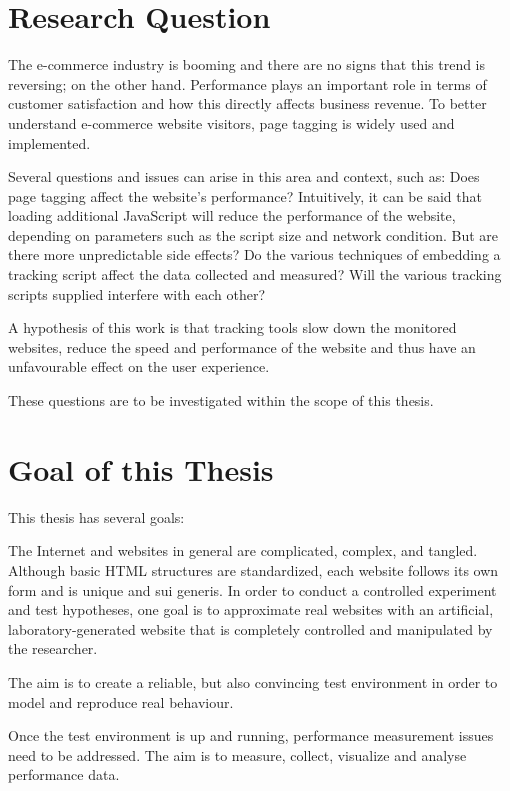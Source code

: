 \section{Research Question}
\label{chapter:research_question}

The e-commerce industry is booming and there are no signs that this trend is reversing; on the other hand.
Performance plays an important role in terms of customer satisfaction and how this directly affects business revenue.
To better understand e-commerce website visitors, page tagging is widely used and implemented.

Several questions and issues can arise in this area and context, such as: Does page tagging affect the website's performance?
Intuitively, it can be said that loading additional JavaScript will reduce the performance of the website, depending on parameters such as the script size and network condition.
But are there more unpredictable side effects?
Do the various techniques of embedding a tracking script affect the data collected and measured?
Will the various tracking scripts supplied interfere with each other?

A hypothesis of this work is that tracking tools slow down the monitored websites, reduce the speed and performance of the website and thus have an unfavourable effect on the user experience.

These questions are to be investigated within the scope of this thesis.




\section{Goal of this Thesis}

This thesis has several goals:

The Internet and websites in general are complicated, complex, and tangled.
Although basic HTML structures are standardized, each website follows its own form and is unique and sui generis.
In order to conduct a controlled experiment and test hypotheses, one goal is to approximate real websites with an artificial, laboratory-generated website that is completely controlled and manipulated by the researcher.

The aim is to create a reliable, but also convincing test environment in order to model and reproduce real behaviour.

Once the test environment is up and running, performance measurement issues need to be addressed.
The aim is to measure, collect, visualize and analyse performance data.

